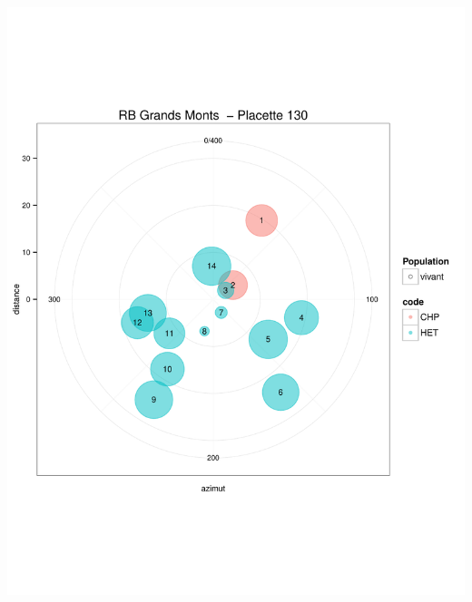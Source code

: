 \documentclass[a4paper]{book}\usepackage[]{graphicx}\usepackage[]{color}
\makeatletter
\def\maxwidth{ %
  \ifdim\Gin@nat@width>\linewidth
    \linewidth
  \else
    \Gin@nat@width
  \fi
}
\newenvironment{knitrout}{}{} %
\makeatother
\begin{document}
\begin{knitrout}
{\centering \includegraphics[width=\maxwidth]{Figures/PlanArbres-6} 

}





\end{knitrout}
\end{document}
